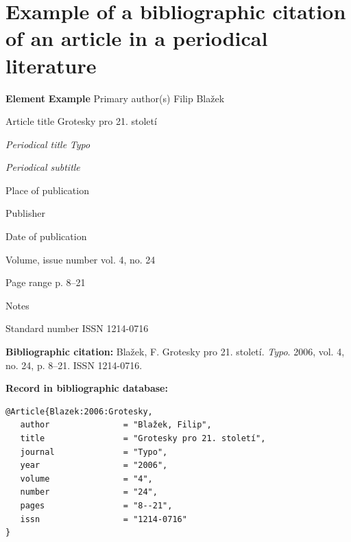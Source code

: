 \newpage
\section*{Example of a bibliographic citation of an article in a periodical literature}
\label{pr-casopis-clanek}
\begin{tabbing} 
\zarazky
\textbf{Element} \> \textbf{Example} \odradkovani
Primary author(s) \>
Filip {\sc Blažek}

\odradkovani
Article title \>
Grotesky pro 21. století

\odradkovani
{\em Periodical title}\>
{\em Typo}

\odradkovani
{\em Periodical subtitle}\footnotemark[1]

\odradkovani
Place of publication\footnotemark[1] \>

\odradkovani
Publisher\footnotemark[1] \>

\odradkovani
Date of publication 

\odradkovani
Volume, issue number \>
vol. 4, no. 24

\odradkovani
Page range \>
p. 8--21

\odradkovani
Notes\footnotemark[2] \>

\odradkovani
Standard number \>
ISSN 1214-0716

\odradkovani
\end{tabbing}

\noindent \textbf{Bibliographic citation:} \odradkovani
{\sc Blažek}, F. Grotesky pro 21. století. {\em Typo}. 2006, vol. 4, no. 24,
p. 8--21. ISSN 1214-0716.

\bigskip \bigskip
\noindent \textbf{Record in bibliographic database:}
\vspace{-0.5em}
\begin{verbatim}
@Article{Blazek:2006:Grotesky,
   author               = "Blažek, Filip",
   title                = "Grotesky pro 21. století",
   journal              = "Typo",
   year                 = "2006",
   volume               = "4",
   number               = "24",
   pages                = "8--21",
   issn                 = "1214-0716"
}
\end{verbatim}


\newpage
